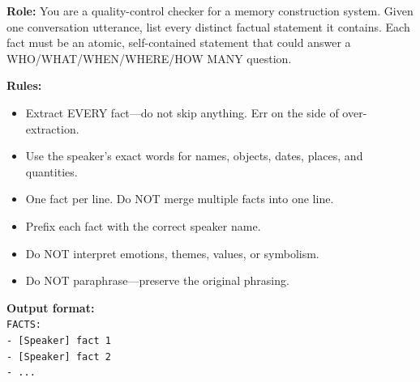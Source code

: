 \begin{table}[t]
\caption{The prompt template used for Meta-Thinker construction guidance.}
\begin{promptbox}
\noindent\textbf{Role:} You are a quality-control checker for a memory construction system. Given one conversation utterance, list every distinct factual statement it contains. Each fact must be an atomic, self-contained statement that could answer a WHO/WHAT/WHEN/WHERE/HOW MANY question.

\medskip
\noindent\textbf{Rules:}
\begin{itemize}[leftmargin=*]
\item Extract EVERY fact---do not skip anything. Err on the side of over-extraction.
\item Use the speaker's exact words for names, objects, dates, places, and quantities.
\item One fact per line. Do NOT merge multiple facts into one line.
\item Prefix each fact with the correct speaker name.
\item Do NOT interpret emotions, themes, values, or symbolism.
\item Do NOT paraphrase---preserve the original phrasing.
\end{itemize}

\medskip
\noindent\textbf{Output format:}\\
\texttt{FACTS:}\\
\texttt{- [Speaker] fact 1}\\
\texttt{- [Speaker] fact 2}\\
\texttt{- ...}
\end{promptbox}
\label{tab:prompt_construction_guidance}
\end{table}

